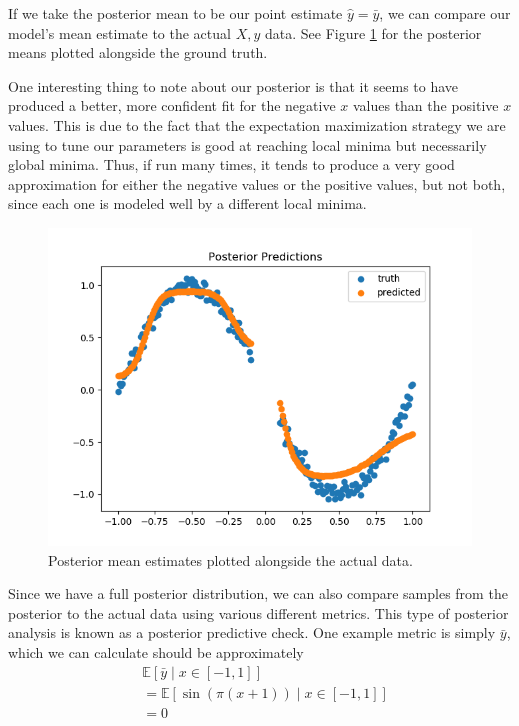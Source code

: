 \documentclass[
    preprint,
    12pt,
    letterpaper,
    longbibliography,
    nofootinbib,
    amsmath,
    amssymb,
    amsfonts,
]{revtex4-1}
\newcommand{\bk}[1]{\left[#1\right]}
\newcommand{\where}{\mid}
\newcommand{\bbm}[1]{\mathbb{#1}}
\begin{document}
\newpage

If we take the posterior mean to be our point estimate $\hat y = \bar y$, we can compare our model's mean estimate to the actual $X, y$ data. See Figure \ref{fig:4} for the posterior means plotted alongside the ground truth.

One interesting thing to note about our posterior is that it seems to have produced a better, more confident fit for the negative $x$ values than the positive $x$ values. This is due to the fact that the expectation maximization strategy we are using to tune our parameters is good at reaching local minima but necessarily global minima. Thus, if run many times, it tends to produce a very good approximation for either the negative values or the positive values, but not both, since each one is modeled well by a different local minima.

\begin{figure}
\includegraphics{Figure_4.png}
\caption{Posterior mean estimates plotted alongside the actual data.}
\label{fig:4}
\end{figure}

\newpage

Since we have a full posterior distribution, we can also compare samples from the posterior to the actual data using various different metrics. This type of posterior analysis is known as a posterior predictive check.\cite{ppc} One example metric is simply $\bar y$, which we can calculate should be approximately
\begin{align*}
    & \bbm E\bk{\bar y \where x \in [-1, 1]} \\
    & = \bbm E\bk{\sin(\pi(x+1)) \where x \in [-1, 1]} \\
    & = 0
\end{align*}
\end{document}
